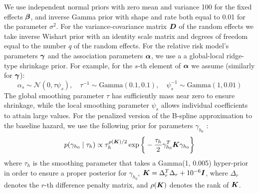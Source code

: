 We use independent normal priors with zero mean and variance 100 for the fixed effects $\boldsymbol{\beta}$, and inverse Gamma prior with shape and rate both equal to 0.01 for the parameter $\sigma^2$. For the variance-covariance matrix $\boldsymbol{D}$ of the random effects we take inverse Wishart prior with an identity scale matrix and degrees of freedom equal to the number $q$ of the random effects. For the relative risk model's parameters $\boldsymbol{\gamma}$ and the association parameters $\boldsymbol{\alpha}$, we use a a global-local ridge-type shrinkage prior. For example, for the $s$-{th} element of $\boldsymbol{\alpha}$ we assume (similarly for $\boldsymbol{\gamma}$):
\begin{equation*} 
\alpha_s \sim \mathcal{N}(0, \tau\psi_s), \quad \tau^{-1} \sim \mbox{Gamma}(0.1, 0.1),  \quad \psi_s^{-1} \sim \mbox{Gamma}(1, 0.01)
\end{equation*} 
The global smoothing parameter $\tau$ has sufficiently mass near zero to ensure shrinkage, while the local smoothing parameter $\psi_s$ allows individual coefficients to attain large values. For the penalized version of the B-spline approximation to the baseline hazard, we use the following prior for parameters $\gamma_{h_0}$ \citep{lang2004bayesian}:
\begin{equation*}
p(\gamma_{h_0} \mid \tau_h) \propto \tau_h^{\rho(\boldsymbol{K})/2} \exp\bigg\{-\frac{\tau_h}{2}\gamma_{h_0}^T \boldsymbol{K} \gamma_{h_0}\bigg\}
\end{equation*}
where $\tau_h$ is the smoothing parameter that takes a Gamma(1, 0.005) hyper-prior in order to ensure a proper posterior for $\gamma_{h_0}$, $\boldsymbol{K} = \Delta_r^T \Delta_r + 10^{-6} \boldsymbol{I}$, where $\Delta_r$ denotes the $r$-th difference penalty matrix, and $\rho(\boldsymbol{K})$ denotes the rank of $\boldsymbol{K}$.